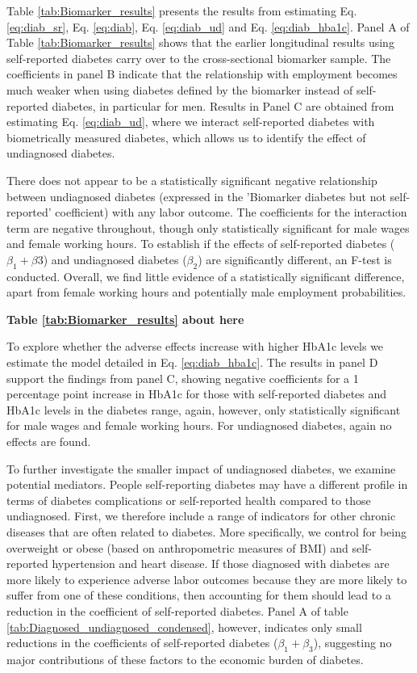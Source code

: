 \documentclass[12pt,english]{article}
\begin{document}
Table \ref{tab:Biomarker_results} presents the results from estimating Eq. \ref{eq:diab_sr}, Eq. \ref{eq:diab}, Eq. \ref{eq:diab_ud} and Eq. \ref{eq:diab_hba1c}. Panel A of Table \ref{tab:Biomarker_results} shows that the earlier longitudinal results using self-reported diabetes carry over to the cross-sectional biomarker sample. The coefficients in panel B indicate that the relationship with employment becomes much weaker when using diabetes defined by the biomarker instead of self-reported diabetes, in particular for men. Results in Panel C are obtained from estimating Eq. \ref{eq:diab_ud}, where we interact self-reported diabetes with biometrically measured diabetes, which allows us to identify the effect of undiagnosed diabetes. 

There does not appear to be a statistically significant negative relationship between undiagnosed diabetes (expressed in the 'Biomarker diabetes but not self-reported' coefficient) with any labor outcome. The coefficients for the interaction term are negative throughout, though only statistically significant for male wages and female working hours. To establish if the effects of self-reported diabetes ($\beta_{1} + \beta{3}$) and undiagnosed diabetes ($\beta_{2}$) are significantly different, an F-test is conducted. Overall, we find little evidence of a statistically significant difference, apart from female working hours and potentially male employment probabilities.

\begin{center}
	\textbf{Table \ref{tab:Biomarker_results} about here}
\end{center}


To explore whether the adverse effects increase with higher  \ac{HbA1c} levels we estimate the model detailed in Eq. \ref{eq:diab_hba1c}. The results in panel D support the findings from panel C, showing negative coefficients for a 1 percentage point increase in \ac{HbA1c} for those with self-reported diabetes and \ac{HbA1c} levels in the diabetes range, again, however, only statistically significant for male wages and female working hours. For undiagnosed diabetes, again no effects are found.

To further investigate the smaller impact of undiagnosed diabetes, we examine potential mediators. People self-reporting diabetes may have a different profile in terms of diabetes complications or self-reported health compared to those undiagnosed. First, we therefore include a range of indicators for other chronic diseases that are often related to diabetes. More specifically, we control for being overweight or obese (based on anthropometric measures of \ac{BMI}) and self-reported hypertension and heart disease. If those diagnosed with diabetes are more likely to experience adverse labor outcomes because they are more likely to suffer from one of these conditions, then accounting for them should lead to a reduction in the coefficient of self-reported diabetes. Panel A of table \ref{tab:Diagnosed_undiagnosed_condensed}, however, indicates only small reductions in the coefficients of self-reported diabetes ($\beta_{1}+\beta_{3}$), suggesting no major contributions of these factors to the economic burden of diabetes. 
\end{document}
